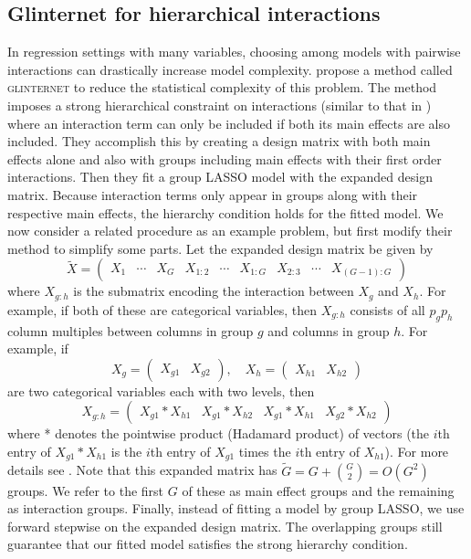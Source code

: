 \documentclass{imsart}
\begin{document}
\subsection{Glinternet for hierarchical interactions}
\label{sec:glint}
In regression settings with many variables, choosing among models with pairwise interactions can drastically increase model complexity. \cite{glint} propose a method called \textsc{glinternet} to reduce the statistical complexity of this problem. The method imposes a strong hierarchical constraint on interactions (similar to that in \cite{bien:hierarchical}) where an interaction term can only be included if both its main effects are also included. They accomplish this by creating a design matrix with both main effects alone and also with groups including main effects with their first order interactions. Then they fit a group LASSO model with the expanded design matrix. Because interaction terms only appear in groups along with their respective main effects, the hierarchy condition holds for the fitted model. We now consider a related procedure as an example problem, but first modify their method to simplify some parts. Let the expanded design matrix be given by
\begin{equation}
\label{eq:glintmat}
\tilde X = \begin{pmatrix} X_1 & \cdots & X_G & X_{1:2} & \cdots & X_{1:G} & X_{2:3} & \cdots & X_{(G-1):G}  \end{pmatrix}
\end{equation}
where $X_{g:h}$ is the submatrix encoding the interaction between $X_g$
and $X_h$. For example, if both of these are categorical variables,
then $X_{g:h}$ consists of all
$p_gp_h$  column multiples between columns in group $g$ and columns
in group $h$. For example, if
\[
X_g = \begin{pmatrix} X_{g1} & X_{g2} \end{pmatrix}, \quad
X_h = \begin{pmatrix} X_{h1} & X_{h2} \end{pmatrix}
\]
are two categorical variables each with two levels, then
\[
X_{g:h} = \begin{pmatrix} X_{g1} * X_{h1} & X_{g1} * X_{h2} & X_{g1} * X_{h1} & X_{g2} * X_{h2} \end{pmatrix}
\]
where * denotes the pointwise product (Hadamard product) of vectors
(the $i$th entry of $X_{g1} * X_{h1}$ is the $i$th entry of $X_{g1}$ times
the $i$th entry of $X_{h1}$). For more details see \cite{glint}.
Note that this expanded matrix has
$\tilde G = G + \binom{G}{2} = O(G^2)$ groups. We refer to the first
$G$ of these as main effect groups and the remaining
as interaction groups. Finally, instead of fitting a
model by group LASSO, we use forward stepwise on the expanded design
matrix. The overlapping groups still guarantee that our fitted model
satisfies the strong hierarchy condition. 
\end{document}
